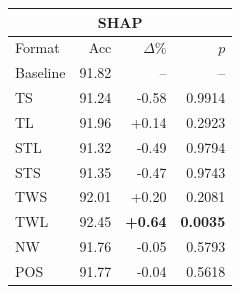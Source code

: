 \begin{tabular}{lrrr}
\toprule
\multicolumn{4}{c}{\textbf{SHAP }} \\
\midrule
Format & Acc & $\Delta$\% & $p$ \\
\midrule
Baseline & 91.82 & -- & -- \\
\midrule
TS & 91.24 & -0.58 & 0.9914 \\
TL & 91.96 & +0.14 & 0.2923 \\
STL & 91.32 & -0.49 & 0.9794 \\
STS & 91.35 & -0.47 & 0.9743 \\
TWS & 92.01 & +0.20 & 0.2081 \\
TWL & 92.45 & \textbf{+0.64} & \textbf{0.0035} \\
NW & 91.76 & -0.05 & 0.5793 \\
POS & 91.77 & -0.04 & 0.5618 \\
\bottomrule
\end{tabular}